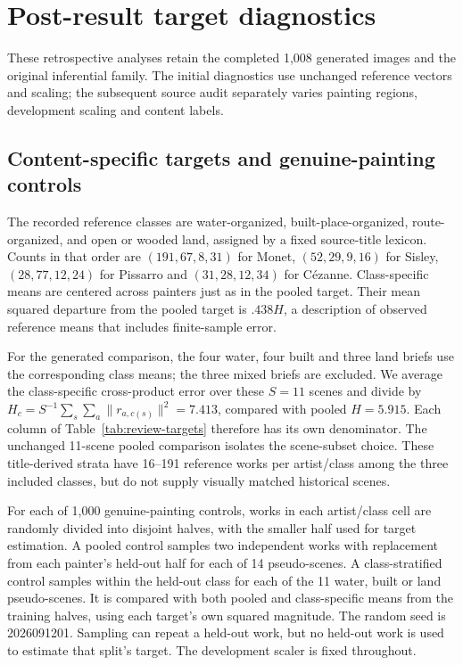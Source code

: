 \section{Post-result target diagnostics}\label{app:diagnostics}
These retrospective analyses retain the completed 1,008 generated images and
the original inferential family. The initial diagnostics use unchanged reference
vectors and scaling; the subsequent source audit separately varies painting
regions, development scaling and content labels.

\subsection{Content-specific targets and genuine-painting controls}
The recorded reference classes are water-organized, built-place-organized,
route-organized, and open or wooded land, assigned by a fixed source-title
lexicon. Counts in that order are $(191,67,8,31)$ for Monet, $(52,29,9,16)$ for
Sisley, $(28,77,12,24)$ for Pissarro and $(31,28,12,34)$ for C\'ezanne.
Class-specific means are centered across painters just as in the pooled target.
Their mean squared departure from the pooled target is $.438H$, a description
of observed reference means that includes finite-sample error.

For the generated comparison, the four water, four built and three land briefs
use the corresponding class means; the three mixed briefs are excluded.
We average the class-specific cross-product error over these $S=11$ scenes and divide by
$H_c=S^{-1}\sum_s\sum_a\|r_{a,c(s)}\|^2=7.413$, compared with pooled $H=5.915$.
Each column of Table~\ref{tab:review-targets} therefore has its own denominator.
The unchanged 11-scene pooled comparison isolates the scene-subset choice.
These title-derived strata have 16--191 reference works per artist/class among
the three included classes, but do not supply visually matched historical scenes.

For each of 1,000 genuine-painting controls, works in each artist/class cell
are randomly divided into disjoint halves, with the smaller half used for
target estimation. A pooled control samples two independent works with replacement
from each painter's held-out half for each of 14 pseudo-scenes. A class-stratified
control samples within the held-out class for each of the 11 water, built or
land pseudo-scenes. It is compared with both pooled and class-specific means
from the training halves, using each target's own squared magnitude.
The random seed is 2026091201. Sampling can repeat a held-out work, but no
held-out work is used to estimate that split's target. The development scaler
is fixed throughout.

